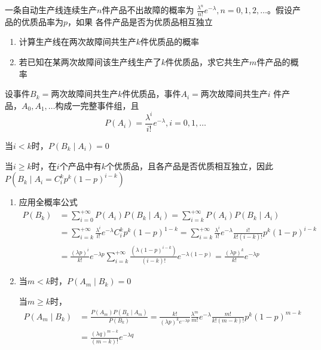 \documentclass{article}
\begin{document}
\begin{examplle}[]
一条自动生产线连续生产\(n\)件产品不出故障的概率为
\(\frac{\lambda^n}{n!}e^{-\lambda},n=0,1,2,\dots\)。假设产品的优质品率为\(p\)，如果
各件产品是否为优质品相互独立
\begin{enumerate}
\item 计算生产线在两次故障间共生产\(k\)件优质品的概率
\item 若已知在某两次故障间该生产线生产了\(k\)件优质品，求它共生产\(m\)件产品的概
率
\end{enumerate}


设事件\(B_k=\)两次故障间共生产\(k\)件优质品，事件\(A_i=\)两次故障间共生产\(i\)
件产品，\(A_0,A_1,\dots\)构成一完整事件组，且
\begin{equation*}
P(A_i)=\frac{\lambda^i}{i!}e^{-\lambda},i=0,1,\dots
\end{equation*}

当\(i<k\)时，\(P(B_k\mid A_i)=0\)

当\(i\ge k\)时，在\(i\)个产品中有\(k\)个优质品，且各产品是否优质相互独立，因此
\(P(B_k\mid A_i=C_i^kp^k(1-p)^{i-k})\)

\begin{enumerate}
\item 应用全概率公式
\begin{align*}
P(B_k)&=\sum_{i=0}^{+\infty}P(A_i)P(B_k\mid A_i)=\sum_{i=k}^{ +\infty}
P(A_i)P(B_k\mid A_i)\\&=\sum_{i=k}^{ +\infty}\frac{\lambda^i}{i!}e^{-\lambda}C_i^kp^k(1-p)^{1-k}
=\sum_{i=k}^{ +\infty}\frac{\lambda^i}{i!}e^{-\lambda}\frac{i!}{k!(i-k)!}p^k(1-p)^{i-k}\\
&=\frac{(\lambda p)^i}{k!}e^{-\lambda p}\sum_{i=k}^{ +\infty}
\frac{(\lambda(1-p)^{i-k})}{(i-k)!}e^{-\lambda (1-p)}=
\frac{(\lambda p)^k}{k!}e^{-\lambda p}
\end{align*}
\item 当\(m<k\)时，\(P(A_m\mid B_k)=0\)

当\(m\ge k\)时，
\begin{align*}
P(A_m\mid B_k)&=\frac{P(A_m)P(B_k\mid A_m)}{P(B_k)}=
\frac{k!}{(\lambda p)^ke^{-\lambda p}}\frac{\lambda^m}{m!}e^{-\lambda}
\frac{m!}{k!(m-k)!}p^k(1-p)^{m-k}\\
&=\frac{(\lambda q)^{m-k}}{(m-k)!}e^{-\lambda q}
\end{align*}
\end{enumerate}
\end{examplle}
\end{document}
